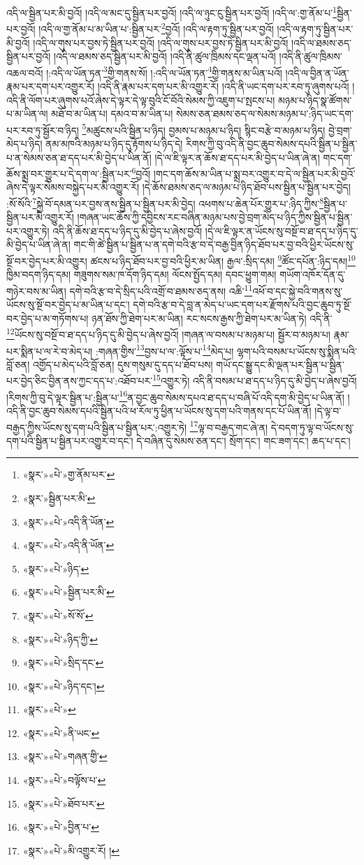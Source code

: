 འདི་ལ་སྦྱིན་པར་མི་བྱའོ། །འདི་ལ་མང་དུ་སྦྱིན་པར་བྱའོ། །འདི་ལ་ཉུང་ངུ་སྦྱིན་པར་བྱའོ། །འདི་ལ་:གྱ་ནོམ་པ་\footnote{«སྣར་»«པེ་»གྱ་ནོམ་པར་}སྦྱིན་པར་བྱའོ། །འདི་ལ་གྱ་ནོམ་པ་མ་ཡིན་པ་:སྦྱིན་པར་\footnote{«སྣར་»སྦྱིན་པར་མི་}བྱའོ། །འདི་ལ་རྟག་ཏུ་སྦྱིན་པར་བྱའོ། །འདི་ལ་རྟག་ཏུ་སྦྱིན་པར་མི་བྱའོ། །འདི་ལ་གུས་པར་བྱས་ཏེ་སྦྱིན་པར་བྱའོ། །འདི་ལ་གུས་པར་བྱས་ཏེ་སྦྱིན་པར་མི་བྱའོ། །འདི་ལ་ཐམས་ཅད་སྦྱིན་པར་བྱའོ། །འདི་ལ་ཐམས་ཅད་སྦྱིན་པར་མི་བྱའོ། །འདི་ནི་ཚུལ་ཁྲིམས་དང་ལྡན་པའོ། །འདི་ནི་ཚུལ་ཁྲིམས་འཆལ་བའོ། །:འདི་ལ་ཡོན་ཏན་\footnote{«སྣར་»«པེ་»འདི་ནི་ཡོན་}གྱི་གནས་སོ། །:འདི་ལ་ཡོན་ཏན་\footnote{«སྣར་»«པེ་»འདི་ནི་ཡོན་}གྱི་གནས་མ་ཡིན་པའོ། །འདི་ལ་བྱིན་ན་ཡོན་རྣམ་པར་དག་པར་འགྱུར་རོ། །འདི་ནི་རྣམ་པར་དག་པར་མི་འགྱུར་རོ། །འདི་ནི་ཡང་དག་པར་རབ་ཏུ་ཞུགས་པའོ། །འདི་ནི་ལོག་པར་ཞུགས་པའོ་ཞེས་དེ་ལྟར་དེ་ལྟ་བུའི་ངོ་བོའི་སེམས་ཀྱི་འཇུག་པ་སྤངས་པ། མཉམ་པ་ཉིད་སྣ་ཚོགས་པ་མ་ཡིན་ལ། མཐོ་བ་མ་ཡིན་པ། དམའ་བ་མ་ཡིན་པ། སེམས་ཅན་ཐམས་ཅད་ལ་སེམས་མཉམ་པ་:ཉིད་ཡང་དག་པར་རབ་ཏུ་སྦྱོར་བ་ཉིད། \footnote{«སྣར་»«པེ་»ཉིད་}མཚུངས་པའི་སྦྱིན་པ་ཉིད། བྱམས་པ་མཉམ་པ་ཉིད། སྙིང་བརྩེ་བ་མཉམ་པ་ཉིད། བྱེ་བྲག་མེད་པ་ཉིད། ནམ་མཁའི་མཉམ་པ་ཉིད་དུ་རྟོགས་པ་ཉིད་དེ། རིགས་ཀྱི་བུ་འདི་ནི་བྱང་ཆུབ་སེམས་དཔའི་སྦྱིན་པ་སྦྱིན་པ་ན་སེམས་ཅན་ཐ་དད་པར་མི་བྱེད་པ་ཡིན་ནོ། །དེ་ལ་ཇི་ལྟར་ན་ཆོས་ཐ་དད་པར་མི་བྱེད་པ་ཡིན་ཞེ་ན། གང་དག་ཆོས་སྨྲ་བར་གྱུར་པ་དེ་དག་ལ་:སྦྱིན་པར་\footnote{«སྣར་»«པེ་»སྦྱིན་པར་མི་}བྱའོ། །གང་དག་ཆོས་མ་ཡིན་པ་སྨྲ་བར་འགྱུར་བ་དེ་ལ་སྦྱིན་པར་མི་བྱའོ་ཞེས་དེ་ལྟར་སེམས་བསྐྱེད་པར་མི་འགྱུར་རོ། །དེ་ཆོས་ཐམས་ཅད་ལ་མཉམ་པ་ཉིད་ཐོབ་པས་སྦྱིན་པ་སྦྱིན་པར་བྱེད། :སོ་སོའི་\footnote{«སྣར་»«པེ་»སོ་སོ་}སྐྱེ་བོ་དམན་པར་བྱས་ནས་སྦྱིན་པ་སྦྱིན་པར་མི་བྱེད། འཕགས་པ་ཆེན་པོར་གྱུར་པ་:ཉིད་ཀྱིས་\footnote{«སྣར་»«པེ་»ཉིད་ཀྱི་}སྦྱིན་པ་སྦྱིན་པར་མི་འགྱུར་རོ། །གཞན་ཡང་ཆོས་ཀྱི་དབྱིངས་རང་བཞིན་མཉམ་པས་བྱེ་བྲག་མེད་པ་ཉིད་ཀྱིས་སྦྱིན་པ་སྦྱིན་པར་འགྱུར་ཏེ། འདི་ནི་ཆོས་ཐ་དད་པ་ཉིད་དུ་མི་བྱེད་པ་ཞེས་བྱའོ། །དེ་ལ་ཇི་ལྟར་ན་ཡོངས་སུ་བསྔོ་བ་ཐ་དད་པ་ཉིད་དུ་མི་བྱེད་པ་ཡིན་ཞེ་ན། གང་གི་ཚེ་སྦྱིན་པ་སྦྱིན་པ་ན་དགེ་བའི་རྩ་བ་དེ་བརྒྱ་བྱིན་ཉིད་ཐོབ་པར་བྱ་བའི་ཕྱིར་ཡོངས་སུ་སྔོ་བར་བྱེད་པར་མི་འགྱུར། ཚངས་པ་ཉིད་ཐོབ་པར་བྱ་བའི་ཕྱིར་མ་ཡིན། རྒྱལ་:སྲིད་དམ། \footnote{«སྣར་»«པེ་»སྲིད་དང་}ཚོང་དཔོན་:ཉིད་དམ།\footnote{«སྣར་»«པེ་»ཉིད་དང་།} ཁྱིམ་བདག་ཉིད་དམ། གཟུགས་སམ་ཁ་དོག་ཉིད་དམ། ལོངས་སྤྱོད་དམ། དབང་ཕྱུག་གམ། གཡོག་འཁོར་དོན་དུ་གཉེར་བས་མ་ཡིན། དགེ་བའི་རྩ་བ་དེ་སྲིད་པའི་འགྲོ་བ་ཐམས་ཅད་ནས། འཆི་\footnote{«སྣར་»«པེ་»}འཕོ་བ་དང་སྐྱེ་བའི་གནས་སུ་ཡོངས་སུ་སྔོ་བར་བྱེད་པ་མ་ཡིན་པ་དང་། དགེ་བའི་རྩ་བ་དེ་བླ་ན་མེད་པ་ཡང་དག་པར་རྫོགས་པའི་བྱང་ཆུབ་ཏུ་སྔོ་བར་བྱེད་པ་མ་གཏོགས་པ། ཉན་ཐོས་ཀྱི་ཐེག་པར་མ་ཡིན། རང་སངས་རྒྱས་ཀྱི་ཐེག་པར་མ་ཡིན་ཏེ། འདི་ནི་\footnote{«སྣར་»«པེ་»ནི་ཡང་}ཡོངས་སུ་བསྔོ་བ་ཐ་དད་པ་ཉིད་དུ་མི་བྱེད་པ་ཞེས་བྱའོ། །གཞན་ལ་བསམ་པ་མཉམ་པ། སྦྱོར་བ་མཉམ་པ། རྣམ་པར་སྨིན་པ་ལ་རེ་བ་མེད་པ། :གཞན་གྱིས་\footnote{«སྣར་»«པེ་»གཞན་གྱི་}བྱས་པ་ལ་:ལྟོས་པ་\footnote{«སྣར་»«པེ་»བལྟོས་པ་}མེད་པ། ལྷག་པའི་བསམ་པ་ཡོངས་སུ་སྨིན་པའི་བློ་ཅན། འགྱོད་པ་མེད་པའི་བློ་ཅན། དུས་གསུམ་དུ་དད་པ་ཐོབ་པས། གཡོ་དང་སྒྱུ་དང་མི་ལྡན་པར་སྦྱིན་པ་སྦྱིན་པར་བྱེད་ཅིང་བྱིན་ནས་ཀྱང་དད་པ་:འཐོབ་པར་\footnote{«སྣར་»«པེ་»ཐོབ་པར་}འགྱུར་ཏེ། འདི་ནི་བསམ་པ་ཐ་དད་པ་ཉིད་དུ་མི་བྱེད་པ་ཞེས་བྱའོ། །རིགས་ཀྱི་བུ་དེ་ལྟར་སྦྱིན་པ་:སྦྱིན་པ་\footnote{«སྣར་»«པེ་»བྱིན་པ་}ན་བྱང་ཆུབ་སེམས་དཔའ་ཐ་དད་པ་བཞི་པོ་འདི་དག་མི་བྱེད་པ་ཡིན་ནོ། །འདི་ནི་བྱང་ཆུབ་སེམས་དཔའི་སྦྱིན་པའི་ཕ་རོལ་ཏུ་ཕྱིན་པ་ཡོངས་སུ་དག་པའི་གནས་དང་པོ་ཡིན་ནོ། །དེ་ལྟ་བ་བརྒྱད་ཀྱིས་ཡོངས་སུ་དག་པའི་སྦྱིན་པ་སྦྱིན་པར་:འགྱུར་ཏེ། \footnote{«སྣར་»«པེ་»མི་འགྱུར་རོ། ། }ལྟ་བ་བརྒྱད་གང་ཞེ་ན། དེ་བདག་ཏུ་ལྟ་བ་ཡོངས་སུ་དག་པའི་སྦྱིན་པ་སྦྱིན་པར་འགྱུར་བ་དང་། དེ་བཞིན་དུ་སེམས་ཅན་དང་། སྲོག་དང་། གང་ཟག་དང་། ཆད་པ་དང་། 